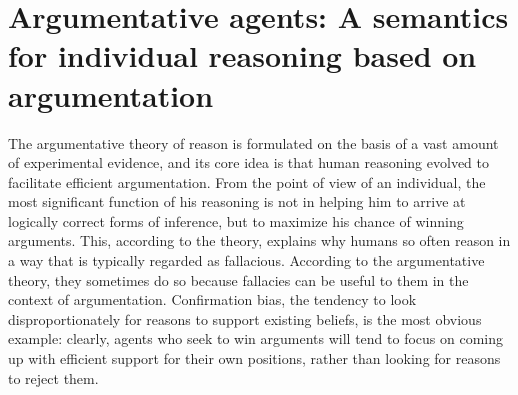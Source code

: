 \documentclass[greybox]{svmult}
\begin{document}
%

\section{Argumentative agents: A semantics for individual reasoning based on argumentation}\label{sec:arg}

The argumentative theory of reason is formulated on the basis of a vast amount of experimental evidence, and its core idea is that human reasoning evolved to facilitate efficient argumentation. From the point of view of an individual, the most significant function of his reasoning is not in helping him to arrive at logically correct forms of inference, but to maximize his chance of winning arguments. This, according to the theory, explains why humans so often reason in a way that is typically regarded as fallacious. According to the argumentative theory, they sometimes do so because fallacies can be useful to them in the context of argumentation. Confirmation bias, the tendency to look disproportionately for reasons to support existing beliefs, is the most obvious example: clearly, agents who seek to win arguments will tend to focus on coming up with efficient support for their own positions, rather than looking for reasons to reject them. 
\end{document}

